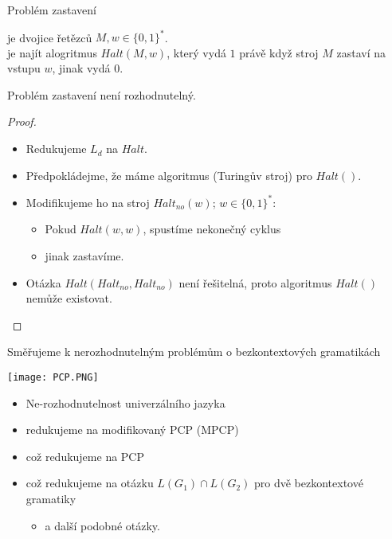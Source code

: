     \begin{frame}{Problém zastavení}
    \begin{definition}
     je dvojice řetězců $M,w\in \{0,1\}^*$.\\  je najít alogritmus $Halt(M,w)$, který vydá $1$ právě když stroj $M$ zastaví na vstupu $w$, jinak vydá $0$.
    \end{definition}
    \begin{theorem*}
    Problém zastavení není rozhodnutelný.
    \end{theorem*}
    
    
    \begin{proof}
    \begin{itemize}%
        \item Redukujeme $L_d$ na $Halt$.
            \item Předpokládejme, že máme algoritmus (Turingův stroj) pro $Halt()$.
            \item Modifikujeme ho na stroj $Halt_{no}(w)$; $w\in \{0,1\}^*$:
        \begin{itemize}
            \item Pokud $Halt(w,w)$, spustíme nekonečný cyklus
            \item jinak zastavíme.
        \end{itemize}
        \item Otázka $Halt(Halt_{no}, Halt_{no})$ není řešitelná, proto algoritmus $Halt()$ nemůže existovat.
    \end{itemize}
    \end{proof}
    \end{frame}
        
    
    \begin{frame}{Směřujeme k nerozhodnutelným problémům o bezkontextových gramatikách}
    
    \texttt{[image: PCP.PNG]}
    \begin{itemize}
        \item Ne-rozhodnutelnost univerzálního jazyka
     \item redukujeme na modifikovaný PCP (MPCP)
     \item což redukujeme na PCP
     \item což redukujeme na otázku $L(G_1)\cap L(G_2)$ pro dvě bezkontextové gramatiky
     \begin{itemize}\item a další podobné otázky.
    \end{itemize}
    \end{itemize}
    \end{frame}
    
